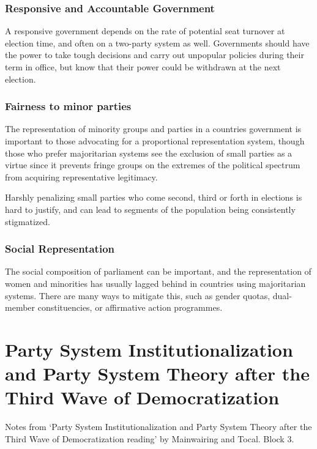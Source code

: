 \subsubsection{Responsive and Accountable Government}

A responsive government depends on the rate of potential seat turnover
at election time, and often on a two-party system as well. Governments
should have the power to take tough decisions and carry out unpopular
policies during their term in office, but know that their power could
be withdrawn at the next election.

\subsubsection{Fairness to minor parties}

The representation of minority groups and parties in a countries
government is important to those advocating for a proportional
representation system, though those who prefer majoritarian systems see
the exclusion of small parties as a virtue since it prevents fringe
groups on the extremes of the political spectrum from acquiring
representative legitimacy.

Harshly penalizing small parties who come second, third or forth in
elections is hard to justify, and can lead to segments of the
population being consistently stigmatized.

\subsubsection{Social Representation}

The social composition of parliament can be important, and the
representation of women and minorities has usually lagged behind in
countries using majoritarian systems. There are many ways to mitigate
this, such as gender quotas, dual-member constituencies, or affirmative
action programmes.

\section{Party System Institutionalization and Party System Theory
  after the Third Wave of Democratization}
\begin{flushright}
  \scriptsize Notes from `Party System Institutionalization and Party
  System Theory after the Third Wave of Democratization reading' by
  Mainwairing and Tocal. Block 3.
\end{flushright}

